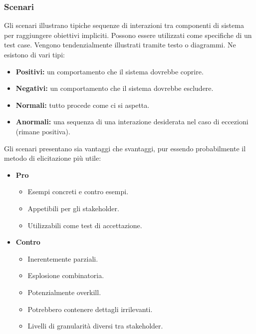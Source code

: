 \documentclass[../main.tex]{subfiles}
\begin{document}
\subsubsection{Scenari}
Gli scenari illustrano tipiche sequenze di interazioni tra componenti di sistema per raggiungere obiettivi impliciti. Possono essere utilizzati come specifiche di un test case.
Vengono tendenzialmente illustrati tramite testo o diagrammi. Ne esistono di vari tipi:
\begin{itemize}
	\item \textbf{Positivi:} un comportamento che il sistema dovrebbe coprire.
	\item \textbf{Negativi:} un comportamento che il sistema dovrebbe escludere.
	\item \textbf{Normali:} tutto procede come ci si aspetta.
	\item \textbf{Anormali:} una sequenza di una interazione desiderata nel caso di eccezioni (rimane positiva).
\end{itemize}
Gli scenari presentano sia vantaggi che svantaggi, pur essendo probabilmente il metodo di elicitazione più utile:
\begin{itemize}
	\item \textbf{Pro}
	\begin{itemize}
		\item Esempi concreti e contro esempi.
		\item Appetibili per gli stakeholder.
		\item Utilizzabili come test di accettazione.
	\end{itemize}
	\item \textbf{Contro}
	\begin{itemize}
		\item Inerentemente parziali.
		\item Esplosione combinatoria.
		\item Potenzialmente overkill.
		\item Potrebbero contenere dettagli irrilevanti.
		\item Livelli di granularità diversi tra stakeholder.
	\end{itemize}
\end{itemize}
\end{document}
